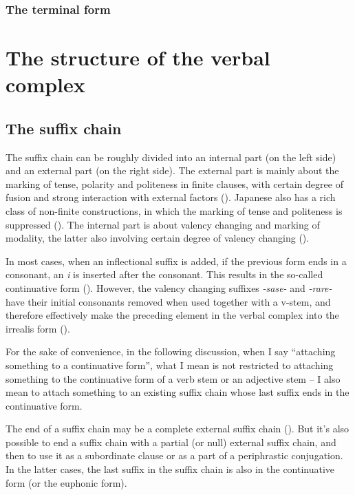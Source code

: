 \documentclass[UTF8, a4paper, oneside, scheme=plain]{ctexrep}
\newcommand{\corpus}[1]{\emph{#1}}
\begin{document}
\subsubsection{The terminal form}\label{sec:adjective-terminal-form}

\section{The structure of the verbal complex}\label{sec:verbal-complex-overview}

\subsection{The suffix chain}\label{sec:suffix-chain}

The suffix chain can be roughly divided into an internal part (on the left side) 
and an external part (on the right side). 
The external part is mainly about 
the marking of tense, polarity and politeness in finite clauses,
with certain degree of fusion
and strong interaction with external factors ().
Japanese also has a rich class of non-finite constructions,
in which the marking of tense and politeness is suppressed ().
The internal part is about valency changing and marking of modality,
the latter also involving certain degree of valency changing ().

In most cases,
when an inflectional suffix is added,
if the previous form ends in a consonant,
an \corpus{i} is inserted after the consonant.
This results in the so-called continuative form ().
However, the valency changing suffixes \corpus{-sase-} and \corpus{-rare-}
have their initial consonants removed when used together with a v-stem,
and therefore effectively make the preceding element in the verbal complex into the irrealis form 
().

For the sake of convenience,
in the following discussion,
when I say ``attaching something to a continuative form'',
what I mean is not restricted to 
attaching something to the continuative form of a verb stem or an adjective stem 
-- I also mean to attach something to an existing suffix chain 
whose last suffix ends in the continuative form.

The end of a suffix chain may be a complete external suffix chain 
().
But it's also possible to end a suffix chain with a partial (or null) external suffix chain,
and then to use it as a subordinate clause or as a part of a periphrastic conjugation.
In the latter cases, 
the last suffix in the suffix chain is also in the continuative form
(or the euphonic form).
\end{document}
